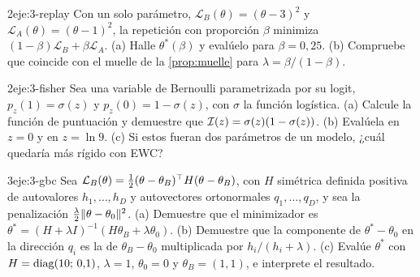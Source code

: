 \begin{ejercicio}{2}{eje:3-replay}
Con un solo parámetro, $\mathcal{L}_B(\theta)=(\theta-3)^{2}$ y $\mathcal{L}_A(\theta)=(\theta-1)^{2}$, la repetición con proporción $\beta$ minimiza $(1-\beta)\mathcal{L}_B+\beta\mathcal{L}_A$. (a) Halle $\theta^{\ast}(\beta)$ y evalúelo para $\beta=0{,}25$. (b) Compruebe que coincide con el muelle de la \cref{prop:muelle} para $\lambda=\beta/(1-\beta)$.
\end{ejercicio}

\begin{ejercicio}{2}{eje:3-fisher}
Sea una variable de Bernoulli parametrizada por su logit, $p_z(1)=\sigma(z)$ y $p_z(0)=1-\sigma(z)$, con $\sigma$ la función logística. (a) Calcule la función de puntuación y demuestre que $\mathcal{I}(z)=\sigma(z)(1-\sigma(z))$. (b) Evalúela en $z=0$ y en $z=\ln 9$. (c) Si estos fueran dos parámetros de un modelo, ¿cuál quedaría más rígido con EWC?
\end{ejercicio}

\begin{ejercicio}{3}{eje:3-gbc}
Sea $\mathcal{L}_B(\theta)=\frac12(\theta-\theta_B)^{\top} H(\theta-\theta_B)$, con $H$ simétrica definida positiva de autovalores $h_1,\dots,h_D$ y autovectores ortonormales $q_1,\dots,q_D$, y sea la penalización $\frac{\lambda}{2}\lVert\theta-\theta_0\rVert^{2}$. (a) Demuestre que el minimizador es $\theta^{\ast}=(H+\lambda I)^{-1}(H\theta_B+\lambda\theta_0)$. (b) Demuestre que la componente de $\theta^{\ast}-\theta_0$ en la dirección $q_i$ es la de $\theta_B-\theta_0$ multiplicada por $h_i/(h_i+\lambda)$. (c) Evalúe $\theta^{\ast}$ con $H=\operatorname{diag}(10;\,0{,}1)$, $\lambda=1$, $\theta_0=0$ y $\theta_B=(1,1)$, e interprete el resultado.
\end{ejercicio}
